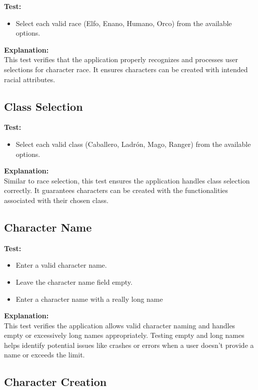 \documentclass{article}
\begin{document}
\textbf{Test:}
\begin{itemize}
    \item Select each valid race (Elfo, Enano, Humano, Orco) from the available options.
\end{itemize}

\textbf{Explanation:}\\
This test verifies that the application properly recognizes and processes user selections for character race. It ensures characters can be created with intended racial attributes.

\subsection{Class Selection}

\textbf{Test:}
\begin{itemize}
    \item Select each valid class (Caballero, Ladrón, Mago, Ranger) from the available options.
\end{itemize}

\textbf{Explanation:}\\
Similar to race selection, this test ensures the application handles class selection correctly. It guarantees characters can be created with the functionalities associated with their chosen class. 

\subsection{Character Name}

\textbf{Test:}
\begin{itemize}
    \item Enter a valid character name.
    \item Leave the character name field empty.
    \item Enter a character name with a really long name
\end{itemize}

\textbf{Explanation:}\\
This test verifies the application allows valid character naming and handles empty or excessively long names appropriately. Testing empty and long names helps identify potential issues like crashes or errors when a user doesn't provide a name or exceeds the limit.

\subsection{Character Creation}
\end{document}
